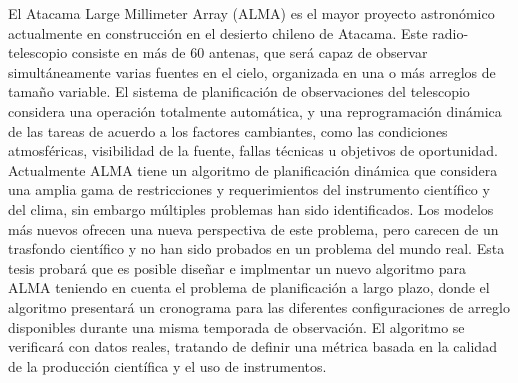 El Atacama Large Millimeter Array (ALMA) es el mayor proyecto astron\'omico actualmente en
construcci\'on en el desierto chileno de Atacama. Este radio-telescopio consiste en m\'as de 60
antenas, que ser\'a capaz de observar simult\'aneamente varias fuentes en el cielo, organizada en una o m\'as arreglos
de tama\~no variable. El sistema de planificaci\'on de observaciones del telescopio
considera una operaci\'on totalmente autom\'atica, y una reprogramaci\'on din\'amica de las tareas de
acuerdo a los factores cambiantes, como las condiciones atmosf\'ericas, visibilidad de la fuente,
fallas t\'ecnicas u objetivos de oportunidad.
Actualmente ALMA tiene un algoritmo de planificaci\'on din\'amica que considera una amplia
gama de restricciones y requerimientos del instrumento cient\'ifico y del clima, sin embargo
m\'ultiples problemas han sido identificados. Los modelos m\'as nuevos ofrecen una nueva
perspectiva de este problema, pero carecen de un trasfondo cient\'ifico y no han sido probados en
un problema del mundo real. Esta tesis probar\'a que es posible dise\~nar e implmentar un nuevo algoritmo para ALMA
teniendo en cuenta el problema de planificaci\'on a largo plazo, donde el algoritmo presentar\'a
un cronograma para las diferentes configuraciones de arreglo disponibles durante una misma
temporada de observaci\'on. El algoritmo se verificar\'a con datos reales, tratando de definir una
m\'etrica basada en la calidad de la producci\'on cient\'ifica y el uso de instrumentos.
\vfill

\cleardoublepage